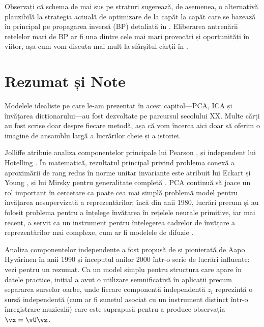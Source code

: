 \documentclass[../../book-main_ro.tex]{subfiles}
\begin{document}
Observați că schema de mai sus pe straturi sugerează, de asemenea, o alternativă plauzibilă la strategia actuală de optimizare de la capăt la capăt care se bazează în principal pe propagarea inversă (BP) detaliată în . Eliberarea antrenării rețelelor mari de BP ar fi una dintre cele mai mari provocări și oportunități în viitor, așa cum vom discuta mai mult la sfârșitul cărții în .

\section{Rezumat și Note}

Modelele idealiste pe care le-am prezentat în acest capitol---PCA, ICA și
învățarea dicționarului---au fost dezvoltate pe parcursul secolului XX.
Multe cărți au fost scrise doar despre fiecare metodă, așa că vom încerca aici
doar să oferim o imagine de ansamblu largă a lucrărilor cheie și a istoriei.

Jolliffe \cite{Jolliffe1986} atribuie analiza componentelor principale lui Pearson
\cite{Pearson1901}, și independent lui Hotelling \cite{Hotelling1933}. În
matematică, rezultatul principal privind problema conexă a aproximării de rang redus în
norme unitar invariante este atribuit lui Eckart și Young
\cite{Eckart1936-ep}, și lui Mirsky pentru generalitate completă \cite{Mirsky1960-ek}.
PCA continuă să joace un rol important în cercetare ca poate cea mai simplă
problemă model pentru învățarea nesupervizată a reprezentărilor: încă din anii 1980,
lucrări precum \textcite{Oja1982SimplifiedNM} și \textcite{Baldi89} au folosit
problema pentru a înțelege învățarea în rețelele neurale primitive, iar mai recent,
a servit ca un instrument pentru înțelegerea cadrelor de învățare a reprezentărilor mai complexe,
cum ar fi modelele de difuzie \cite{wang2024diffusion}.

Analiza componentelor independente a fost propusă de \textcite{Ans-1985} și pionierată de
Aapo Hyv\"{a}rinen în anii 1990 și începutul anilor 2000 într-o serie de lucrări
influente: vezi \textcite{Hyvrinen-2000} pentru un rezumat. Ca un model simplu pentru
structura care apare în datele practice, inițial a avut o utilizare semnificativă în
aplicații precum separarea surselor oarbe, unde fiecare componentă independentă
$z_i$ reprezintă o sursă independentă (cum ar fi sunetul asociat cu un instrument
distinct într-o înregistrare muzicală) care este suprapusă pentru a produce
observația $\vx = \vU \vz$.
\end{document}
